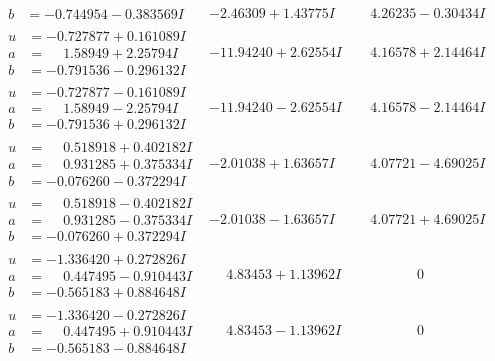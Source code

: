 \documentclass[1p]{elsarticle_modified}
\theoremstyle{definition}
\begin{document}
$$\begin{array}{c|c|c}
\begin{aligned}
b &= -0.744954 - 0.383569 I\end{aligned}
 & -2.46309 + 1.43775 I & \phantom{-}4.26235 - 0.30434 I \\ \hline\begin{aligned}
u &= -0.727877 + 0.161089 I \\
a &= \phantom{-}1.58949 + 2.25794 I \\
b &= -0.791536 - 0.296132 I\end{aligned}
 & -11.94240 + 2.62554 I & \phantom{-}4.16578 + 2.14464 I \\ \hline\begin{aligned}
u &= -0.727877 - 0.161089 I \\
a &= \phantom{-}1.58949 - 2.25794 I \\
b &= -0.791536 + 0.296132 I\end{aligned}
 & -11.94240 - 2.62554 I & \phantom{-}4.16578 - 2.14464 I \\ \hline\begin{aligned}
u &= \phantom{-}0.518918 + 0.402182 I \\
a &= \phantom{-}0.931285 + 0.375334 I \\
b &= -0.076260 - 0.372294 I\end{aligned}
 & -2.01038 + 1.63657 I & \phantom{-}4.07721 - 4.69025 I \\ \hline\begin{aligned}
u &= \phantom{-}0.518918 - 0.402182 I \\
a &= \phantom{-}0.931285 - 0.375334 I \\
b &= -0.076260 + 0.372294 I\end{aligned}
 & -2.01038 - 1.63657 I & \phantom{-}4.07721 + 4.69025 I \\ \hline\begin{aligned}
u &= -1.336420 + 0.272826 I \\
a &= \phantom{-}0.447495 - 0.910443 I \\
b &= -0.565183 + 0.884648 I\end{aligned}
 & \phantom{-}4.83453 + 1.13962 I & \phantom{-0.000000 } 0 \\ \hline\begin{aligned}
u &= -1.336420 - 0.272826 I \\
a &= \phantom{-}0.447495 + 0.910443 I \\
b &= -0.565183 - 0.884648 I\end{aligned}
 & \phantom{-}4.83453 - 1.13962 I & \phantom{-0.000000 } 0 \\ \hline\begin{aligned}

\end{aligned}
\end{array}$$
\end{document}
